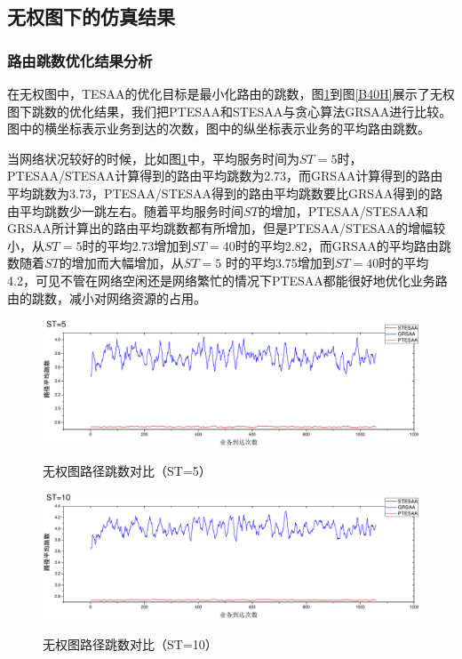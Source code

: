 \subsection{无权图下的仿真结果}
\subsubsection{路由跳数优化结果分析}

在无权图中，TESAA的优化目标是最小化路由的跳数，图\ref{B5H}到图\ref{B40H}展示了无权图下跳数的优化结果，我们把PTESAA和STESAA与贪心算法GRSAA进行比较。图中的横坐标表示业务到达的次数，图中的纵坐标表示业务的平均路由跳数。

当网络状况较好的时候，比如图\ref{B5H}中，平均服务时间为$ST=5$时，PTESAA/STESAA计算得到的路由平均跳数为2.73，而GRSAA计算得到的路由平均跳数为3.73，PTESAA/STESAA得到的路由平均跳数要比GRSAA得到的路由平均跳数少一跳左右。随着平均服务时间$ST$的增加，PTESAA/STESAA和GRSAA所计算出的路由平均跳数都有所增加，但是PTESAA/STESAA的增幅较小，从$ST=5$时的平均2.73增加到$ST=40$时的平均2.82，而GRSAA的平均路由跳数随着$ST$的增加而大幅增加，从$ST=5$ 时的平均3.75增加到$ST=40$时的平均4.2，可见不管在网络空闲还是网络繁忙的情况下PTESAA都能很好地优化业务路由的跳数，减小对网络资源的占用。
\begin{figure}
\setlength{\abovecaptionskip}{-0.5cm}
\begin{center}
{\includegraphics[width=1 \textwidth]{figures/B5H.pdf}}
\end{center}
\caption{{\footnotesize{无权图路径跳数对比（ST=5）}}}
\label{B5H}
\end{figure}
\begin{figure}
\vspace{-0.5cm}
\setlength{\abovecaptionskip}{-0.5cm}
\begin{center}
{\includegraphics[width=1 \textwidth]{figures/B10H.pdf}}
\end{center}
\caption{{\footnotesize{无权图路径跳数对比（ST=10）}}}
\label{B10H}
\end{figure}
